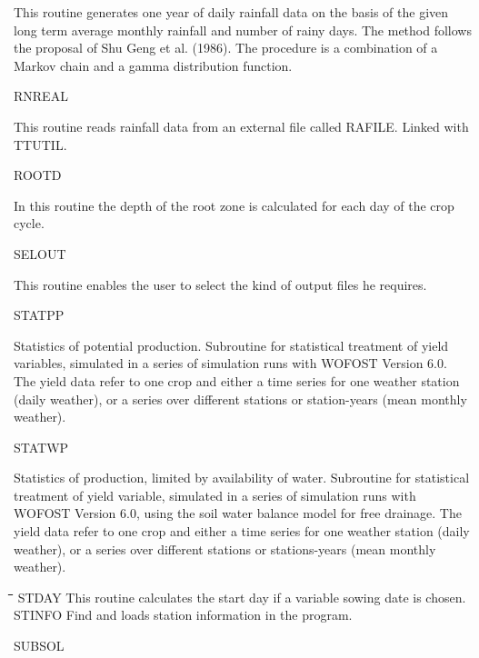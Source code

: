 \documentclass[11pt]{article}
\begin{document}
\begin{indenting}{2.54cm}
This routine generates one year of daily rainfall data on the basis of the
given long term average monthly rainfall and number of rainy days. The
method follows the proposal of Shu Geng et al. (1986). The procedure is a
combination of a Markov chain and a gamma distribution function.
\end{indenting}
RNREAL
\testlastline

\begin{indenting}{2.54cm}
This routine reads rainfall data from an external file called RAFILE.
Linked with TTUTIL.
\end{indenting}
ROOTD
\testlastline

\begin{indenting}{2.54cm}
In this routine the depth of the root zone is calculated for each day of the
crop cycle.
\end{indenting}
SELOUT
\testlastline

\begin{indenting}{2.54cm}
This routine enables the user to select the kind of output files he requires.
\end{indenting}
STATPP
\testlastline

\begin{indenting}{2.54cm}
Statistics of potential production. Subroutine for statistical treatment of
yield variables, simulated in a series of simulation runs with WOFOST
Version 6.0. The yield data refer to one crop and either a time series for
one weather station (daily weather), or a series over different stations or
station-years (mean monthly weather).
\end{indenting}
STATWP
\testlastline

\begin{indenting}{2.54cm}
Statistics of production, limited by availability of water. Subroutine for
statistical treatment of yield variable, simulated in a series of simulation
runs with WOFOST Version 6.0, using the soil water balance model for
free drainage. The yield data refer to one crop and either a time series for
one weather station (daily weather), or a series over different stations or
stations-years (mean monthly weather).
\end{indenting}
\begin{tabbing}
\hspace{1.27cm}\=\hspace{1.27cm}\=\hspace{1.27cm}\=\hspace{1.27cm}\=%
\hspace{1.27cm}\=\hspace{1.27cm}\=\hspace{1.27cm}\=\hspace{1.27cm}\=%
\hspace{1.27cm}\=\hspace{1.27cm}\=\kill
STDAY\> \> This routine calculates the start day if a variable sowing date is chosen.\\
STINFO\> \> Find and loads station information in the program.
\end{tabbing}
SUBSOL
\testlastline
\end{document}
